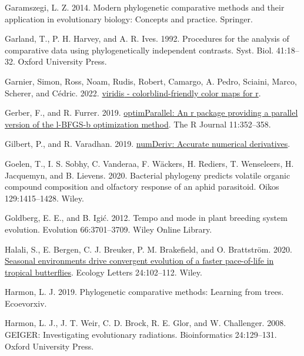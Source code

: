 \documentclass[fleqn,10pt,lineno]{wlpeerj} %
\newlength{\cslhangindent}
\newlength{\cslentryspacingunit} %
\newenvironment{CSLReferences}[2] %
 {%
  \setlength{\parindent}{0pt}
  \ifodd #1
  \let\oldpar\par
  \def\par{\hangindent=\cslhangindent\oldpar}
  \fi
  \setlength{\parskip}{#2\cslentryspacingunit}
 }%
 {}
\begin{document}
\begin{CSLReferences}{1}{0}
\leavevmode{}%
Garamszegi, L. Z. 2014. Modern phylogenetic comparative methods and their application in evolutionary biology: Concepts and practice. Springer.

\leavevmode{}%
Garland, T., P. H. Harvey, and A. R. Ives. 1992. Procedures for the analysis of comparative data using phylogenetically independent contrasts. Syst. Biol. 41:18--32. Oxford University Press.

\leavevmode{}%
Garnier, Simon, Ross, Noam, Rudis, Robert, Camargo, A. Pedro, Sciaini, Marco, Scherer, and Cédric. 2022. \href{https://doi.org/10.5281/zenodo.4679424}{{viridis} - colorblind-friendly color maps for r}.

\leavevmode{}%
Gerber, F., and R. Furrer. 2019. \href{https://doi.org/10.32614/RJ-2019-030}{optimParallel: An r package providing a parallel version of the l-BFGS-b optimization method}. The R Journal 11:352--358.

\leavevmode{}%
Gilbert, P., and R. Varadhan. 2019. \href{https://CRAN.R-project.org/package=numDeriv}{numDeriv: Accurate numerical derivatives}.

\leavevmode{}%
Goelen, T., I. S. Sobhy, C. Vanderaa, F. Wäckers, H. Rediers, T. Wenseleers, H. Jacquemyn, and B. Lievens. 2020. Bacterial phylogeny predicts volatile organic compound composition and olfactory response of an aphid parasitoid. Oikos 129:1415--1428. Wiley.

\leavevmode{}%
Goldberg, E. E., and B. Igić. 2012. Tempo and mode in plant breeding system evolution. Evolution 66:3701--3709. Wiley Online Library.

\leavevmode{}%
Halali, S., E. Bergen, C. J. Breuker, P. M. Brakefield, and O. Brattström. 2020. \href{https://doi.org/10.1111/ele.13626}{Seasonal environments drive convergent evolution of a faster pace-of-life in tropical butterflies}. Ecology Letters 24:102--112. Wiley.

\leavevmode{}%
Harmon, L. J. 2019. Phylogenetic comparative methods: Learning from trees. Ecoevorxiv.

\leavevmode{}%
Harmon, L. J., J. T. Weir, C. D. Brock, R. E. Glor, and W. Challenger. 2008. {GEIGER}: Investigating evolutionary radiations. Bioinformatics 24:129--131. Oxford University Press.


\end{CSLReferences}
\end{document}
